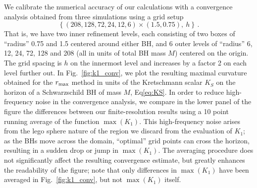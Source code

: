 \documentclass[floats,floatfix,showpacs,amssymb,prd,twocolumn,superscriptaddress,nofootinbib,nolongbibliography,reprint]{revtex4-2}
\begin{document}
We calibrate the numerical accuracy of our
calculations with a convergence analysis obtained
from three simulations using a grid setup
%
\begin{equation}
  \left\{
  (208,128,72,24,12,6)\times
  (1.5,0.75),~h
  \right\}\,.
  \nonumber
\end{equation}
%
That is, we have two inner refinement levels, each consisting
of two boxes of ``radius'' 0.75 and 1.5 centered around
either BH, and 6 outer levels of ``radius'' 6, 12, 24, 72,
128 and 208 (all in units of total BH mass $M$)
centered on the origin. The grid spacing is
$h$ on the innermost level and increases by a factor 2
on each level further out. In Fig.~\ref{fig:k1_conv},
we plot the resulting maximal curvature obtained
for the $r_{\rm max}$ method in units of the
Kretschmann scalar $K_S$ on the horizon of
a Schwarzschild BH of mass $M$, Eq\eqref{eq:KS}. In order to reduce
high-frequency noise in the convergence analysis,
we compare in the lower panel of the figure the differences
between our finite-resolution results using a 10 point
running average of the function $\max (K_1)$. This
high-frequency noise arises from the lego sphere nature of
the region we discard from the evaluation of $K_1$;
as the BHs move across the domain, ``optimal''
grid points can cross the horizon, resulting in
a sudden drop or jump in $\max (K_1)$. The averaging
procedure does not significantly affect the
resulting convergence estimate, but greatly enhances
the readability of the figure; note that only differences
in $\max(K_1)$ have been averaged in Fig.~\ref{fig:k1_conv}, but not $\max(K_1)$ itself. 
\end{document}
